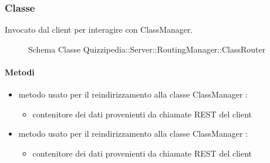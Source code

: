 \subsubsection{Classe }
Invocato dal client per interagire con ClassManager.
\begin{figure}[H]
\centering
\noindent{}
\caption[Schema Classe ClassRouter]{Schema Classe Quizzipedia::Server::RoutingManager::ClassRouter}
\end{figure}
\paragraph{Metodi}
\begin{itemize}
\item {}
\newline
metodo usato per il reindirizzamento alla classe ClassManager
\newline
{} :
\begin{itemize}
\item {}
\newline
contenitore dei dati provenienti da chiamate REST del client
\end{itemize}
\item {}
\newline
metodo usato per il reindirizzamento alla classe ClassManager
\newline
{} :
\begin{itemize}
\item {}
\newline
contenitore dei dati provenienti da chiamate REST del client
\end{itemize}
\end{itemize}
